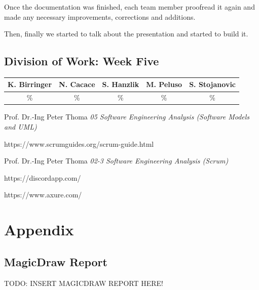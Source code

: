 \documentclass[a4paper, 12pt]{article}
\begin{document}
Once the documentation was finished, each team member proofread it again and made any necessary improvements, corrections and additions.

Then, finally we started to talk about the presentation and started to build it.

\subsection{Division of Work: Week Five}

\begin{table}[h]
\centering
\setlength{\tabcolsep}{10pt}
\begin{tabular}{|c|c|c|c|c|}
\hline
K. Birringer & N. Cacace & S. Hanzlik & M. Peluso & S. Stojanovic\\
\hline
\% & \% & \% & \% & \% \\ 
\hline
\end{tabular}
\end{table}

\newpage    
\begin{thebibliography}{}
Prof. Dr.-Ing Peter Thoma \emph{05 Software Engineering Analysis (Software Models and UML)}

https://www.scrumguides.org/scrum-guide.html

Prof. Dr.-Ing Peter Thoma \emph{02-3 Software Engineering Analysis (Scrum)}
 
https://discordapp.com/
 
https://www.axure.com/

\end{thebibliography}


\newpage


\section{Appendix}

\subsection{MagicDraw Report}
\color{red}TODO: INSERT MAGICDRAW REPORT HERE!\color{black}
\end{document}
